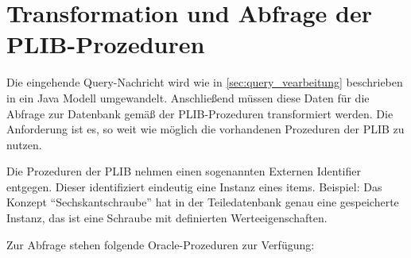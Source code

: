 \section{Transformation und Abfrage der PLIB-Prozeduren}\label{sec:abfrage_plib_prozeduren}

Die eingehende Query-Nachricht wird wie in \autoref{sec:query_vearbeitung} beschrieben in ein Java Modell umgewandelt. Anschließend müssen diese Daten für die Abfrage zur Datenbank gemäß der PLIB-Prozeduren transformiert werden. Die Anforderung ist es, so weit wie möglich die vorhandenen Prozeduren der PLIB zu nutzen. 

Die Prozeduren der \gls{PLIB} nehmen einen sogenannten Externen Identifier entgegen. Dieser identifiziert eindeutig eine Instanz eines \glspl{item}. 
Beispiel: 
Das Konzept \enquote{Sechskantschraube} hat in der Teiledatenbank genau eine gespeicherte Instanz, das ist eine Schraube mit definierten Werteeigenschaften. 

Zur Abfrage stehen folgende Oracle-Prozeduren zur Verfügung:

